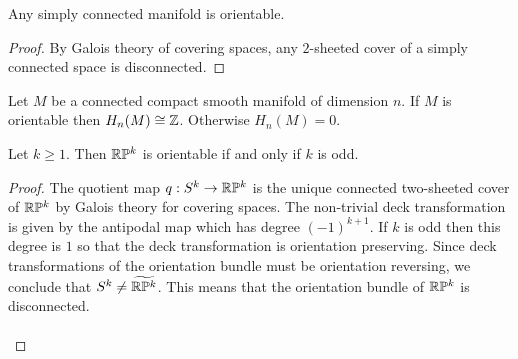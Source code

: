 \documentclass[a4paper]{article}
\begin{document}
\begin{crl}{}{} Any simply connected manifold is orientable. \tcbline
\begin{proof}
By Galois theory of covering spaces, any $2$-sheeted cover of a simply connected space is disconnected. 
\end{proof}
\end{crl}

\begin{prp}{}{} Let $M$ be a connected compact smooth manifold of dimension $n$. If $M$ is orientable then $H_n(M)\cong\mathbb{Z}$. Otherwise $H_n(M)=0$. 
\end{prp}

\begin{prp}{}{} Let $k\geq 1$. Then $\mathbb{R}\mathbb{P}^k$ is orientable if and only if $k$ is odd. \tcbline
\begin{proof}
The quotient map $q:S^k\to\mathbb{R}\mathbb{P}^k$ is the unique connected two-sheeted cover of $\mathbb{R}\mathbb{P}^k$ by Galois theory for covering spaces. The non-trivial deck transformation is given by the antipodal map which has degree $(-1)^{k+1}$. If $k$ is odd then this degree is $1$ so that the deck transformation is orientation preserving. Since deck transformations of the orientation bundle must be orientation reversing, we conclude that $S^k\neq\widetilde{\mathbb{R}\mathbb{P}^k}$. This means that the orientation bundle of $\mathbb{R}\mathbb{P}^k$ is disconnected. \\~\\


\end{proof}
\end{prp}
\end{document}
